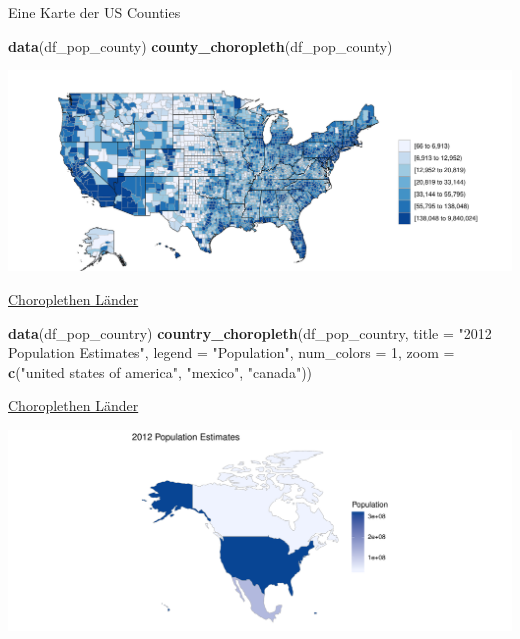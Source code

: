\documentclass[ignorenonframetext,]{beamer}
\newenvironment{Shaded}{\begin{snugshade}}{\end{snugshade}}
\newcommand{\KeywordTok}[1]{\textcolor[rgb]{0.13,0.29,0.53}{\textbf{#1}}}
\newcommand{\DataTypeTok}[1]{\textcolor[rgb]{0.13,0.29,0.53}{#1}}
\newcommand{\DecValTok}[1]{\textcolor[rgb]{0.00,0.00,0.81}{#1}}
\newcommand{\StringTok}[1]{\textcolor[rgb]{0.31,0.60,0.02}{#1}}
\newcommand{\NormalTok}[1]{#1}
\begin{document}
\begin{frame}[fragile]{Eine Karte der US Counties}

\begin{Shaded}
\begin{Highlighting}[]
\KeywordTok{data}\NormalTok{(df_pop_county)}
\KeywordTok{county_choropleth}\NormalTok{(df_pop_county)}
\end{Highlighting}
\end{Shaded}

\includegraphics{slides_all2gether_part1_files/figure-beamer/unnamed-chunk-124-1.pdf}

\end{frame}

\begin{frame}[fragile]{\href{http://mirrors.softliste.de/cran/web/packages/choroplethr/vignettes/d-country-choropleth.html}{Choroplethen
Länder}}

\begin{Shaded}
\begin{Highlighting}[]
\KeywordTok{data}\NormalTok{(df_pop_country)}
\KeywordTok{country_choropleth}\NormalTok{(df_pop_country,}
              \DataTypeTok{title      =} \StringTok{"2012 Population Estimates"}\NormalTok{,}
              \DataTypeTok{legend     =} \StringTok{"Population"}\NormalTok{,}
              \DataTypeTok{num_colors =} \DecValTok{1}\NormalTok{,}
              \DataTypeTok{zoom       =} \KeywordTok{c}\NormalTok{(}\StringTok{"united states of america"}\NormalTok{,}
                             \StringTok{"mexico"}\NormalTok{, }\StringTok{"canada"}\NormalTok{))}
\end{Highlighting}
\end{Shaded}

\end{frame}

\begin{frame}{\href{http://mirrors.softliste.de/cran/web/packages/choroplethr/vignettes/d-country-choropleth.html}{Choroplethen
Länder}}

\includegraphics{slides_all2gether_part1_files/figure-beamer/unnamed-chunk-126-1.pdf}

\end{frame}
\end{document}
